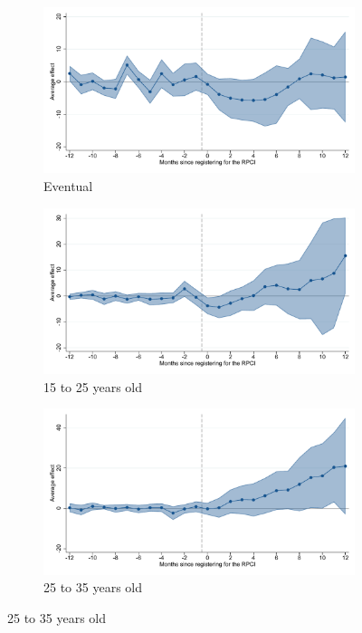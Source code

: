 \begin{figure}[H]
    \begin{subfigure}{0.32\textwidth}
    \caption{Eventual}
    \includegraphics[width=\textwidth]{04_Figures/muestra_10porciento/event_study_sal_cierre_base_te_dcdh_connected.pdf}
    \end{subfigure}
    \begin{subfigure}{0.32\textwidth}
    \caption{15 to 25 years old}
    \includegraphics[width=\textwidth]{04_Figures/muestra_10porciento/event_study_sal_cierre_age_15_25_dcdh_connected.pdf}
    \end{subfigure}
    \begin{subfigure}{0.32\textwidth}
    \caption{25 to 35 years old}
    \includegraphics[width=\textwidth]{04_Figures/muestra_10porciento/event_study_sal_cierre_age_25_35_dcdh_connected.pdf}
    \end{subfigure}


\end{figure}
